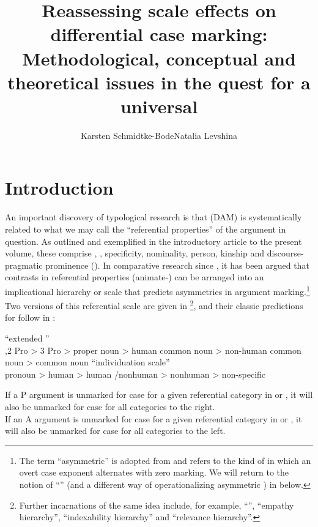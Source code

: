 \documentclass[output=paper]{langscibook}
\title{Reassessing scale effects on differential case marking: Methodological, conceptual and theoretical issues in the quest for a universal}
\author{Karsten Schmidtke-Bode\affiliation{Leipzig University}\lastand  Natalia Levshina\affiliation{Leipzig University}}
\begin{document}
\maketitle


\section{Introduction}\label{18-sc-sec:1}

An important discovery of typological research is that  (DAM) is systematically related to what we may call the “referential properties” of the argument in question. As outlined and exemplified in the introductory article to the present volume, these comprise , , specificity, nominality, person, kinship and discourse-pragmatic prominence (\eg {}). In comparative research since \citet{Silverstein1976Hierarchy}, it has been argued that contrasts in referential properties (\eg animate-) can be arranged into an implicational hierarchy or scale that predicts asymmetries in argument marking.\footnote{The term “asymmetric” is adopted from \citet{Hoopetal2008Case-marking} and refers to the kind of  in which an overt case exponent alternates with zero marking. We will return to the notion of “” (and a different way of operationalizing asymmetric ) in  below.}  Two versions of this referential scale are given in \footnote{Further incarnations of the same idea include, for example,  “”,  “empathy hierarchy”,  “indexability hierarchy” and  “relevance hierarchy”. 
}, and their classic predictions for  follow in :

\ea\label{18-sc-ex:1}
\ea\label{18-sc-ex:1a}
“extended ” \citep[130]{Croft2003Typology}\\
,2 Pro > 3 Pro > proper noun > human common noun > non-human  common noun >  common noun
\ex\label{18-sc-ex:1b}
“individuation scale” \citep[220]{Lazard1998Actancy}\\
\glt pronoun > human  > human /nonhuman  > nonhuman  >  non-specific
\z
\z

\ea\label{18-sc-ex:2}
\ea\label{18-sc-ex:2a}
If a P argument is unmarked for case for a given referential category in  or , it will also be unmarked for case for all categories to the right.\\
\ex\label{18-sc-ex:2b}
If an A argument is unmarked for case for a given referential category in  or , it will also be unmarked for case for all categories to the left.\\
\z
\z
\end{document}
